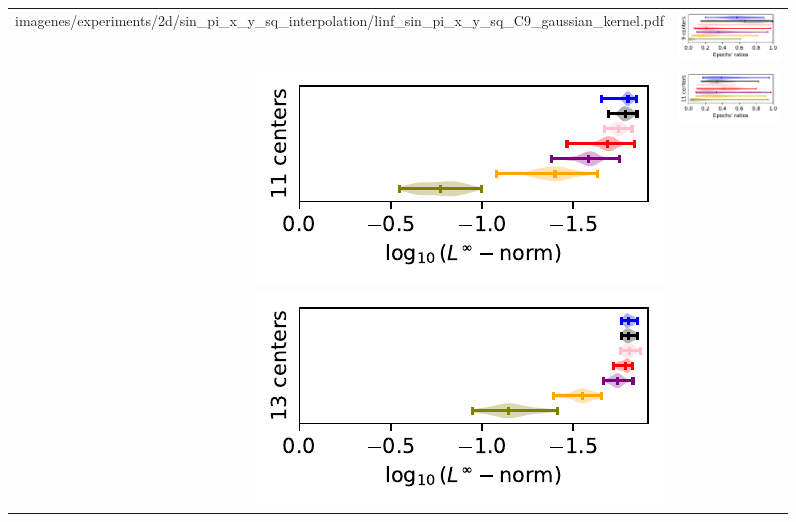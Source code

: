 \documentclass[12pt]{report} %
\begin{document}
\begin{figure}[h]
\begin{tabular}{rl}
{    {imagenes/experiments/2d/sin_pi_x_y_sq_interpolation/linf_sin_pi_x_y_sq_C9_gaussian_kernel.pdf}}  & 
    {\includegraphics[width=.44\textwidth, trim={.7cm 1.15cm 0 0},clip=true]
        {imagenes/experiments/2d/sin_pi_x_y_sq_interpolation/epochs_sin_pi_x_y_sq_C9_gaussian_kernel.pdf}}
    \\
    {\includegraphics[width=.5\textwidth, trim={0 1.25cm 0 0},clip=true]
    {imagenes/experiments/2d/sin_pi_x_y_sq_interpolation/linf_sin_pi_x_y_sq_C11_gaussian_kernel.pdf}} & 
    {\includegraphics[width=.44\textwidth, trim={.7cm 1.15cm 0 0},clip=true]
    {imagenes/experiments/2d/sin_pi_x_y_sq_interpolation/epochs_sin_pi_x_y_sq_C11_gaussian_kernel.pdf}}                                                                                     \\
    {\includegraphics[width=.5\textwidth, trim={0 1.25cm 0 0},clip=true]
    {imagenes/experiments/2d/sin_pi_x_y_sq_interpolation/linf_sin_pi_x_y_sq_C13_gaussian_kernel.pdf}} & 
    {\includegraphics[width=.44\textwidth, trim={.7cm 1.15cm 0 0},clip=true]
}
\end{tabular}
\end{figure}
\end{document}
